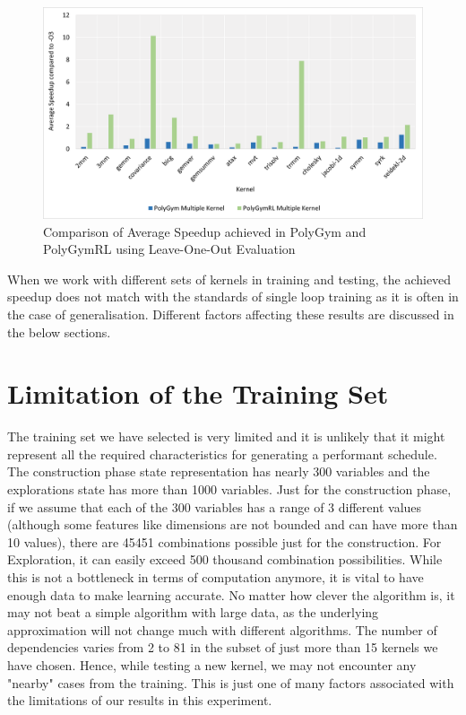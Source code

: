 \documentclass[logo,msc]{infthesis}           %
\begin{document}
\begin{figure}[htbp]
  \centering
  \includegraphics[width=\textwidth]{Images/Chart_Multiple_PolyGym_PolyGymRL.png}    
  \caption{Comparison of Average Speedup achieved in PolyGym and PolyGymRL using Leave-One-Out Evaluation}
  \label{fig:multi_PolyGym_PolyGymRL}
\end{figure}
 
When we work with different sets of kernels in training and testing, the achieved speedup does not match with the standards of single loop training as it is often in the case of generalisation. Different factors affecting these results are discussed in the below sections.

\section{Limitation of the Training Set}
The training set we have selected is very limited and it is unlikely that it might represent all the required characteristics for generating a performant schedule. The construction phase state representation has nearly 300 variables and the explorations state has more than 1000 variables. Just for the construction phase, if we assume that each of the 300 variables has a range of 3 different values (although some features like dimensions are not bounded and can have more than 10 values), there are 45451 combinations possible just for the construction. For Exploration, it can easily exceed 500 thousand combination possibilities. While this is not a bottleneck in terms of computation anymore, it is vital to have enough data to make learning accurate. No matter how clever the algorithm is, it may not beat a simple algorithm with large data, as the underlying approximation will not change much with different algorithms. The number of dependencies varies from 2 to 81 in the subset of just more than 15 kernels we have chosen. Hence, while testing a new kernel, we may not encounter any "nearby" cases from the training. This is just one of many factors associated with the limitations of our results in this experiment. 
\end{document}
